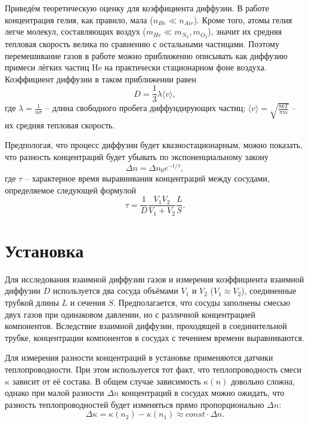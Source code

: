 \documentclass[a4paper]{article}
\begin{document}
    Приведём теоретическую оценку для коэффициента диффузии. В работе концентрация гелия, как правило, мала ($n_{He} \ll n_{Air}$). Кроме того, атомы гелия легче молекул, составляющих воздух ($m_{He} \ll m_{N_2}, m_{O_2}$), значит их средняя тепловая скорость велика по сравнению с остальными частицами. Поэтому перемешивание газов в работе можно приближенно описывать как диффузию примеси лёгких частиц He на практически стационарном фоне воздуха. Коэффициент диффузии в таком приближении равен
    \begin{equation}
        \label{D}
        D = \frac{1}{3} \lambda \langle v \rangle,
    \end{equation}
    где $\lambda = \frac{1}{n\sigma}$ -- длина свободного пробега диффундирующих частиц; $\langle v \rangle = \sqrt{\frac{8kT}{\pi m}}$ -- их средняя тепловая скорость.

    Предпологая, что процесс диффузии будет квазиостационарным, можно показать, что разность концентраций будет убывать по экспоненциальному закону
    \begin{equation}
        \label{Delta_n}
        \Delta n = \Delta n_0 e^{-t / \tau},
    \end{equation}
    где $\tau$ -- характерное время выравнивания концентраций между сосудами, определяемое следующей формулой
    \begin{equation}
        \label{Tau}
        \tau = \frac{1}{D} \frac{V_1V_2}{V_1 + V_2} \frac{L}{S}.
    \end{equation}


\section{Установка}

   Для   исследования   взаимной диффузии газов и измерения коэффициента взаимной диффузии  $D$  используется  два сосуда  объёмами  $V_1$ и $V_2$ ($V_1 \approx V_2$), соединенные трубкой длины $L$ и сечения  $S$. Предполагается, что сосуды заполнены смесью двух газов при одинаковом давлении, но с различной концентрацией компонентов. Вследствие взаимной диффузии, проходящей в   соединительной трубке, концентрации компонентов в сосудах с течением времени выравниваются.

    Для измерения разности  концентраций  в установке применяются датчики теплопроводности. При этом используется тот факт, что теплопроводность смеси $\kappa$ зависит от её состава. В общем случае   зависимость  $\kappa (n)$  довольно   сложна,   однако   при   малой   разности  $\Delta n$ концентраций в сосудах можно ожидать, что разность теплопроводностей будет изменяться прямо пропорционально $\Delta n:$
    \begin{equation*}
        \Delta \kappa = \kappa (n_2) - \kappa (n_1) \approx const \cdot \Delta n.
    \end{equation*}
\end{document}
